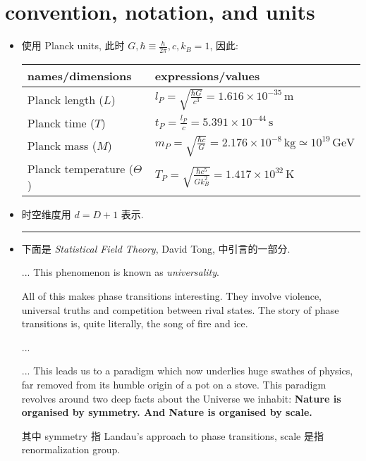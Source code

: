 \chapter*{convention, notation, and units}
\begin{itemize}
	\item 使用 Planck units, 此时 $G, \hbar \equiv \frac{h}{2 \pi}, c, k_B = 1$, 因此:
	
	\begin{center}
		\begin{tabularx}{\linewidth}{XX}
			\toprule 
			names/dimensions & expressions/values \\
			\midrule 
			Planck length ($L$) & $l_P = \sqrt{\frac{\hbar G}{c^3}} = 1.616 \times 10^{- 35} \, \text{m}$ \\
			Planck time ($T$) & $t_P = \frac{l_P}{c} = 5.391 \times 10^{- 44} \, \text{s}$ \\
			Planck mass ($M$) & $m_P = \sqrt{\frac{\hbar c}{G}} = 2.176 \times 10^{- 8} \, \text{kg} \simeq 10^{19} \, \text{GeV}$ \\
			Planck temperature ($\Theta$) & $T_P = \sqrt{\frac{\hbar c^5}{G k_B^2}} = 1.417 \times 10^{32} \, \text{K}$ \\
			\bottomrule
		\end{tabularx}
	\end{center}
	
	\item 时空维度用 $d = D + 1$ 表示.
	
	\noindent\rule[0.5ex]{\linewidth}{0.5pt} %
	
	\item 下面是 \textit{Statistical Field Theory}, David Tong, 中引言的一部分.
	
	\begin{tcolorbox}
		... This phenomenon is known as \textit{universality}.
		
		All of this makes phase transitions interesting. They involve violence, universal truths
		and competition between rival states. The story of phase transitions is, quite literally,
		the song of fire and ice.
		
		...
		
		... This leads us to a paradigm which now underlies huge swathes of physics, far removed from its humble origin of a pot on a stove. This paradigm revolves around two deep facts about the Universe we inhabit: \textbf{Nature is organised by symmetry. And Nature is organised by scale.}
	\end{tcolorbox}
	
	其中 symmetry 指 Landau's approach to phase transitions, scale 是指 renormalization group.
\end{itemize}
